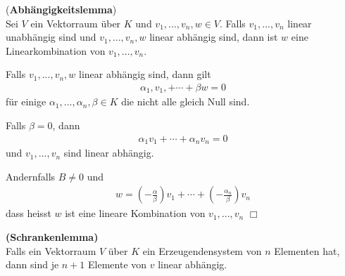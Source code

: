 \documentclass[11pt]{report}
\newcommand*\f[1] {\textbf{#1}}
\begin{document}
\begin{lemma}(\f{Abhängigkeitslemma}) \\
 \label{lemma331}
 Sei $V$ ein Vektorraum über $K$ und $v_1, ..., v_n, w \in V$. Falls $v_1, ..., v_n$ linear unabhängig sind und $v_1, ..., v_n, w$ linear abhängig sind, dann ist $w$ eine Linearkombination von $v_1, ..., v_n$.

Falls $v_1, ..., v_n, w$ linear abhängig sind, dann gilt
\begin{align}
 \alpha_1, v_1, + \cdots + \beta w = 0
\end{align}
für einige $\alpha_1, ..., \alpha_n, \beta \in K$ die nicht alle gleich Null sind.

Falls $\beta = 0$, dann
\begin{align}
 \alpha_1 v_1 + \cdots + \alpha_n v_n = 0
\end{align}
und $v_1, ..., v_n$ sind linear abhängig.

Andernfalls $B \neq 0$ und 
\begin{align}
 w = (- \frac{\alpha}{\beta}) v_1 + \cdots + (- \frac{\alpha_n}{\beta})v_n
\end{align}
dass heisst $w$ ist eine lineare Kombination von $v_1, ..., v_n$ \text{  } \hfill $\Box$
\end{lemma}

\begin{lemma} \f{(Schrankenlemma)} \\
 \label{lemma332}
 Falls ein Vektorraum $V$ über $K$ ein Erzeugendensystem von $n$ Elementen hat, dann sind je $n+1$ Elemente von $v$ linear abhängig.
\end{lemma}
\end{document}
